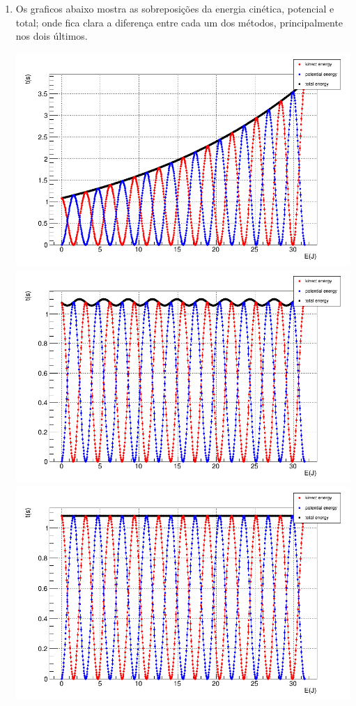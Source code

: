 \documentclass[main.tex]{subfiles}
\begin{document}
\begin{enumerate}[label=\textbf{\alph*)}]
\begin{center}
    \end{center}
\item Os graficos abaixo mostra as sobreposições da energia cinética, potencial e total; onde fica clara a diferença entre cada um dos métodos, principalmente nos dois últimos.
    \begin{center}
        \includegraphics[scale=0.15]{../q1/plots/Energies_t_euler.png}
        \includegraphics[scale=0.15]{../q1/plots/Energies_t_ec.png}
        \includegraphics[scale=0.15]{../q1/plots/Energies_t_RK.png}

\end{center}
\end{enumerate}
\end{document}
